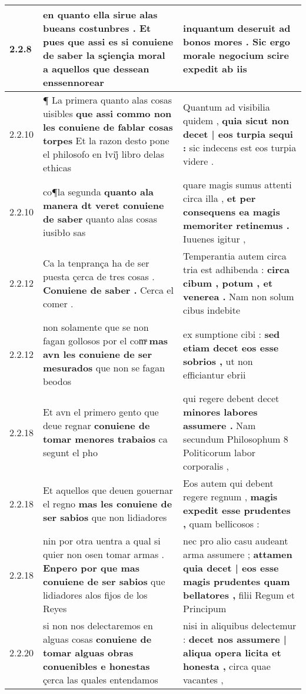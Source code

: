\begin{tabular}{|p{1cm}|p{6.5cm}|p{6.5cm}|}
2.2.8 & en quanto ella sirue alas bueans costunbres . \textbf{ Et pues que assi es si conuiene de saber la sçiençia moral } a aquellos que dessean enssennorear & inquantum deseruit ad bonos mores . \textbf{ Sic ergo morale negocium scire expedit } ab iis \\\hline
2.2.10 & ¶ La primera quanto alas cosas uisibles \textbf{ que assi commo non les conuiene de fablar cosas torpes } Et la razon desto pone el philosofo en łvij̊ libro delas ethicas & Quantum ad visibilia quidem , \textbf{ quia sicut non decet | eos turpia sequi : } sic indecens est eos turpia videre . \\\hline
2.2.10 & co¶la segunda \textbf{ quanto ala manera dt veret conuiene de saber } quanto alas cosas iusibło sas & quare magis sumus attenti circa illa , \textbf{ et per consequens ea magis memoriter retinemus . } Iuuenes igitur , \\\hline
2.2.12 & Ca la tenprança ha de ser puesta çerca de tres cosas . \textbf{ Conuiene de saber . } Cerca el comer . & Temperantia autem circa tria est adhibenda : \textbf{ circa cibum , potum , et venerea . } Nam non solum cibus indebite \\\hline
2.2.12 & non solamente que se non fagan gollosos por el comͣ \textbf{ mas avn les conuiene de ser mesurados } que non se fagan beodos & ex sumptione cibi : \textbf{ sed etiam decet eos esse sobrios , } ut non efficiantur ebrii \\\hline
2.2.18 & Et avn el primero gento que deue regnar \textbf{ conuiene de tomar menores trabaios } ca segunt el pho & qui regere debent decet \textbf{ minores labores assumere . } Nam secundum Philosophum 8 Politicorum labor corporalis , \\\hline
2.2.18 & Et aquellos que deuen gouernar el regno \textbf{ mas les conuiene de ser sabios } que non lidiadores & Eos autem qui debent regere regnum , \textbf{ magis expedit esse prudentes , } quam bellicosos : \\\hline
2.2.18 & nin por otra uentra a qual si quier non osen tomar armas . \textbf{ Enpero por que mas conuiene de ser sabios } que lidiadores alos fijos de los Reyes & nec pro alio casu audeant arma assumere ; \textbf{ attamen quia decet | eos esse magis prudentes quam bellatores , } filii Regum et Principum \\\hline
2.2.20 & si non nos delectaremos en alguas cosas \textbf{ conuiene de tomar alguas obras conuenibles e honestas } çerca las quales entendamos & nisi in aliquibus delectemur : \textbf{ decet nos assumere | aliqua opera licita et honesta , } circa quae vacantes , \\\hline

\end{tabular}
